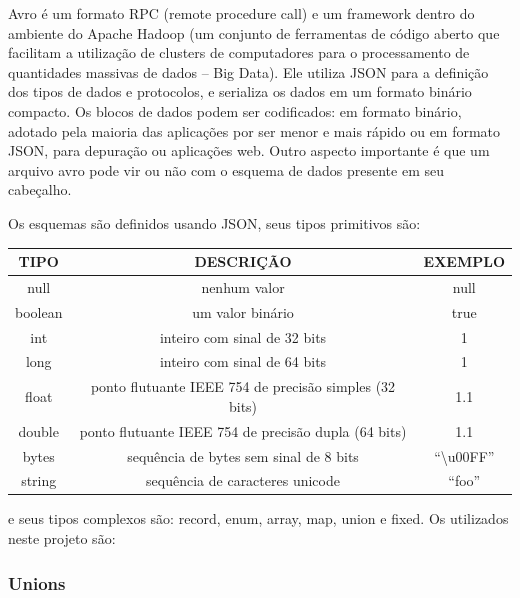 \documentclass[12pt]{article}
\begin{document}
Avro é um formato RPC (remote procedure call) e um framework dentro do ambiente do Apache Hadoop (um conjunto de ferramentas de código aberto que facilitam a utilização de clusters de computadores para o processamento de quantidades massivas de dados – Big Data). Ele utiliza JSON para a definição dos tipos de dados e protocolos, e serializa os dados em um formato binário compacto. Os blocos de dados podem ser codificados: em formato binário, adotado pela maioria das aplicações por ser menor e mais rápido ou em formato JSON, para depuração ou aplicações web. Outro aspecto importante é que um arquivo avro pode vir ou não com o esquema de dados presente em seu cabeçalho.

Os esquemas são definidos usando JSON, seus tipos primitivos são: 
\begin{center}
    \begin{tabular}{ |c|c|c| }
        \hline
        TIPO    & DESCRIÇÃO                                                 & EXEMPLO \\
        \hline
        null    & nenhum valor                                              & null \\
        boolean & um valor binário                                          & true \\
        int     & inteiro com sinal de 32 bits                              & 1 \\
        long    & inteiro com sinal de 64 bits                              & 1 \\
        float   & ponto flutuante IEEE 754 de precisão simples (32 bits)    & 1.1 \\
        double  & ponto flutuante IEEE 754 de precisão dupla (64 bits)      & 1.1 \\
        bytes   & sequência de bytes sem sinal de 8 bits                    & “\textbackslash u00FF” \\
        string  & sequência de caracteres unicode                           & “foo” \\
        \hline
    \end{tabular}
\end{center}

e seus tipos complexos são: record, enum, array, map, union e fixed. Os utilizados neste projeto são:

\subsubsection{Unions}
\end{document}
